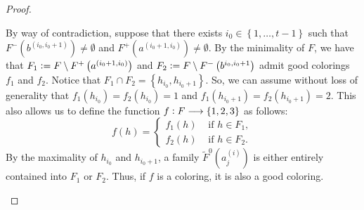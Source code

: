 \documentclass[12pt]{article}
\theoremstyle{definition}
\newcommand{\defeq}{\vcentcolon=}
\begin{document}
\begin{proof}
\begin{itemize}
             By way of contradiction,
             suppose that there exists
             $i_0 \in \left\{1, \ldots, t-1\right\}$
             such that $F^{-}\left(b^{\left(i_0, i_0+1\right)}\right)
             \neq \emptyset$ and
             $F^{+}\left(a^{\left(i_0+1, i_0\right)}\right)
             \neq \emptyset$.
             By the minimality of $F$, 
             we have that
             $F_1 \defeq F \setminus F^{+}
             \left(a^{\left(i_0+1, i_0\right)}\right)$
             and
             $F_2 \defeq F \setminus F^{-}
             \left(b^{i_0,i_0+1}\right)$ 
             admit good colorings
             $f_1$ and $f_2$.
             Notice that $F_1 \cap F_2 = 
             \left\{h_{i_0}, h_{i_0+1}\right\}$.
             So, we can assume without loss
             of generality that
             $f_1\left(h_{i_0}\right) = 
             f_2\left(h_{i_0}\right) = 1$ 
             and $f_1\left(h_{i_0+1}\right) =
             f_2\left(h_{i_0+1}\right) =2$.
             This also allows us to define 
             the function $f \vcentcolon 
             F \longrightarrow \left\{1, 2, 3\right\}$ 
             as follows:
             \begin{equation*}
                f\left(h\right) = 
                \begin{cases}
                    f_1\left(h\right) &\text{ if } h \in F_1, \\
                    f_2\left(h\right) &\text{ if } h \in F_{2}.
                \end{cases}
            \end{equation*} 
             By the maximality
             of $h_{i_0}$ and $h_{i_0+1}$,
             a family
             $\widetilde{F}^{0}\left(a_{j}^{\left(i\right)}\right)$
             is either entirely contained
             into $F_1$ or $F_2$.
             Thus, if $f$ is a coloring,
             it is also a good coloring.


\end{itemize}
\end{proof}
\end{document}
